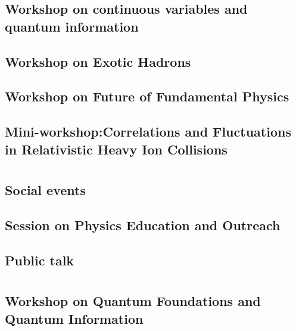 \subsection{Workshop on continuous variables and quantum information}

\clearpage

\subsection{Workshop on Exotic Hadrons}

\clearpage

\subsection{Workshop on Future of Fundamental Physics}

\clearpage

\subsection{Mini-workshop:Correlations and Fluctuations in Relativistic Heavy Ion Collisions}

\clearpage

\section{}
\subsection{Social events}

\clearpage

\subsection{Session on Physics Education  and Outreach}

\clearpage

\subsection{Public talk}

\clearpage

\section{}
\subsection{Workshop on Quantum Foundations and Quantum Information}

\clearpage

